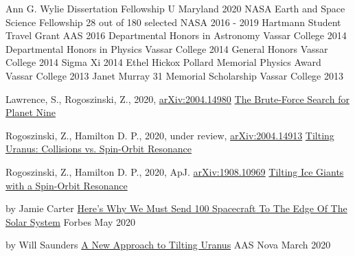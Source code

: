 \documentclass[]{awesome-cv}
\begin{document}
\vspace{-5mm}

\begin{cvhonors}
	\cvhonor
	{Ann G. Wylie Dissertation Fellowship}
	{}
	{U Maryland}
	{2020}
	\cvhonor
	{NASA Earth and Space Science Fellowship}
	{28 out of 180 selected}
	{NASA}
	{2016 - 2019}
	\cvhonor
	{Hartmann Student Travel Grant}
	{}
	{AAS}
	{2016}
	\cvhonor
	{Departmental Honors in Astronomy}
	{}
	{Vassar College}
	{2014}
	\cvhonor
	{Departmental Honors in Physics}
	{}
	{Vassar College}
	{2014}
	\cvhonor
	{General Honors}
	{}
	{Vassar College}
	{2014}
	\cvhonor
	{Sigma Xi}
	{}
	{}
	{2014}
	\cvhonor
	{Ethel Hickox Pollard Memorial Physics Award}
	{}
	{Vassar College}
	{2013}
	\cvhonor
	{Janet Murray \textquotesingle{}31 Memorial Scholarship}
	{}
	{Vassar College}
	{2013}
\end{cvhonors}

\vspace{-0mm}
\begin{cventries}
	\cventry
	{Lawrence, S., Rogoszinski, Z., 2020, \href{https://arxiv.org/pdf/2004.14980.pdf}{arXiv:2004.14980}}
	{\href{https://ui.adsabs.harvard.edu/abs/2020arXiv200414980L/abstract}{The Brute-Force Search for Planet Nine}}
	{}
	{}
	{}
	
	\vspace{-5mm}
	\cventry
	{Rogoszinski, Z., Hamilton D. P., 2020, under review, \href{https://arxiv.org/pdf/2004.14913.pdf}{arXiv:2004.14913}}
	{\href{https://ui.adsabs.harvard.edu/abs/2020arXiv200414913R/abstract}{Tilting Uranus: Collisions vs. Spin-Orbit Resonance}}
	{}
	{}
	{}
	
	
	\vspace{-5mm}
	\cventry
	{Rogoszinski, Z., Hamilton D. P., 2020, ApJ. \href{https://arxiv.org/pdf/1908.10969.pdf}{arXiv:1908.10969}}
	{\href{https://ui.adsabs.harvard.edu/abs/2020ApJ...888...60R/abstract}{Tilting Ice Giants with a Spin-Orbit Resonance}}
	{}
	{}
	{}
	
	\vspace{-5mm}
\end{cventries}

\begin{cventries}
	\cventry
	{by Jamie Carter}
	{\href{https://tinyurl.com/y9yth6w2}{Here’s Why We Must Send 100 Spacecraft To The Edge Of The Solar System}}
	{Forbes}
	{May 2020}
	{}
	
	\vspace{-5mm}
	\cventry
	{by Will Saunders}
	{\href{https://aasnova.org/2020/03/10/a-new-approach-to-tilting-uranus/}{A New Approach to Tilting Uranus}}
	{AAS Nova}
	{March 2020}
	{}
	
	\vspace{-5mm}
\end{cventries}
\end{document}
